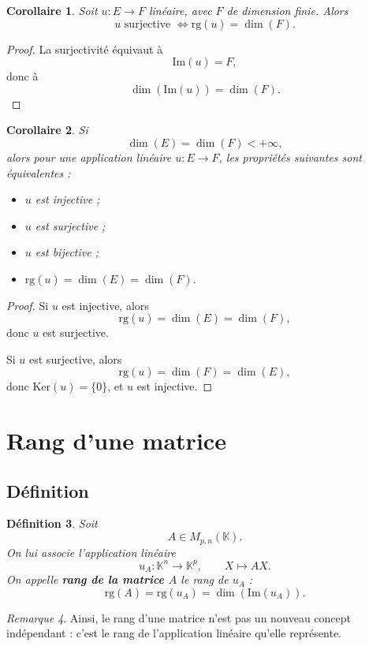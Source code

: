 \documentclass[11pt,a4paper]{article}
\newtheorem{definition}{Définition}[section]
\newtheorem{corollaire}[definition]{Corollaire}
\theoremstyle{remark}
\newtheorem{remarque}[definition]{Remarque}
\newcommand{\K}{\mathbb{K}}
\newcommand{\Ker}{\mathrm{Ker}}
\newcommand{\Img}{\mathrm{Im}}
\newcommand{\rg}{\mathrm{rg}}
\begin{document}
\begin{corollaire}
Soit \(u:E\to F\) linéaire, avec \(F\) de dimension finie. Alors
\[
u \text{ surjective }
\Longleftrightarrow
\rg(u)=\dim(F).
\]
\end{corollaire}

\begin{proof}
La surjectivité équivaut à
\[
\Img(u)=F,
\]
donc à
\[
\dim(\Img(u))=\dim(F).
\]
\end{proof}

\begin{corollaire}
Si
\[
\dim(E)=\dim(F)<+\infty,
\]
alors pour une application linéaire \(u:E\to F\), les propriétés suivantes sont équivalentes :
\begin{itemize}
    \item \(u\) est injective ;
    \item \(u\) est surjective ;
    \item \(u\) est bijective ;
    \item \(\rg(u)=\dim(E)=\dim(F)\).
\end{itemize}
\end{corollaire}

\begin{proof}
Si \(u\) est injective, alors
\[
\rg(u)=\dim(E)=\dim(F),
\]
donc \(u\) est surjective.

Si \(u\) est surjective, alors
\[
\rg(u)=\dim(F)=\dim(E),
\]
donc \(\Ker(u)=\{0\}\), et \(u\) est injective.
\end{proof}

\section{Rang d’une matrice}

\subsection{Définition}

\begin{definition}
Soit
\[
A\in M_{p,n}(\K).
\]
On lui associe l’application linéaire
\[
u_A:\K^n\to\K^p,\qquad X\mapsto AX.
\]
On appelle \textbf{rang de la matrice \(A\)} le rang de \(u_A\) :
\[
\rg(A)=\rg(u_A)=\dim(\Img(u_A)).
\]
\end{definition}

\begin{remarque}
Ainsi, le rang d’une matrice n’est pas un nouveau concept indépendant : c’est le rang de l’application linéaire qu’elle représente.
\end{remarque}
\end{document}

